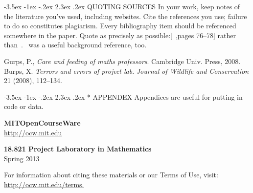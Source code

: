 \documentclass{article}
\makeatletter
\renewcommand\section{\@startsection{section}{1}{\z@}%
	{-3.5ex \@plus -1ex \@minus -.2ex}%
	{2.3ex \@plus.2ex}%
	{\normalfont\large}}
\makeatother
\begin{document}
\section{QUOTING SOURCES}
 In your work, keep notes of the literature you’ve used, including websites. Cite the references you use; failure to do so constitutes plagiarism. Every bibliography item should be referenced somewhere in the paper. Quote as precisely as possible:[~\cite{itref},pages 76--78] rather than~\cite{itref}.~\cite{itref2} was a useful background reference, too.
  \begingroup \renewcommand{\refname}{REFERENCES}
  \begin{thebibliography}{9}
  	Gurps, P., \emph{Care and feeding of maths professors}. Cambridge Univ. Press, 2008.
  	Burps, X. \emph{Terrors and errors of project lab}. \emph{Journal of Wildlife and Conservation} 21 (2008), 112--134.
  \end{thebibliography}
  \endgroup
  \appendix
\section*{ APPENDEX}
Appendices are useful for putting in code or data.\newline
 
 \begin{flushleft}\textbf{MITOpenCourseWare}\\\textcolor{blue}{\underline{\href{http://ocw.mit.edu}{http://ocw.mit.edu}}}\end{flushleft}
 \vspace{1cm}
 \begin{flushleft}\textbf{18.821 Project Laboratory in Mathematics}\\Spring 2013 \end{flushleft}
  \vspace{1cm} 
 For information about citing these materials or our Terms of Use, visit:\textcolor{blue}{\underline{\href{http://ocw.mit.edu/terms}{ http://ocw.mit.edu/terms.}}}
\end{document}
